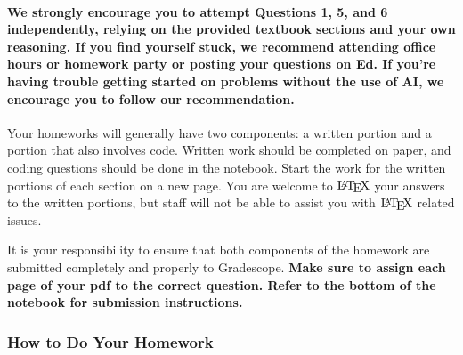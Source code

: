 \documentclass[11pt]{article}
\let\Oldlatex\LaTeX
\renewcommand{\LaTeX}{\textrm{\Oldlatex}}
\begin{document}
\hypertarget{we-strongly-encourage-you-to-attempt-questions-1-5-and-6-independently-relying-on-the-provided-textbook-sections-and-your-own-reasoning.-if-you-find-yourself-stuck-we-recommend-attending-office-hours-or-homework-party-or-posting-your-questions-on-ed.-if-youre-having-trouble-getting-started-on-problems-without-the-use-of-ai-we-encourage-you-to-follow-our-recommendation.}{%
\paragraph{\texorpdfstring{\textbf{We strongly encourage you to attempt
Questions 1, 5, and 6 independently, relying on the provided textbook
sections and your own reasoning. If you find yourself stuck, we
recommend attending office hours or homework party or posting your
questions on Ed. If you're having trouble getting started on problems
without the use of AI, we encourage you to follow our
recommendation.}}{We strongly encourage you to attempt Questions 1, 5, and 6 independently, relying on the provided textbook sections and your own reasoning. If you find yourself stuck, we recommend attending office hours or homework party or posting your questions on Ed. If you're having trouble getting started on problems without the use of AI, we encourage you to follow our recommendation.}}\label{we-strongly-encourage-you-to-attempt-questions-1-5-and-6-independently-relying-on-the-provided-textbook-sections-and-your-own-reasoning.-if-you-find-yourself-stuck-we-recommend-attending-office-hours-or-homework-party-or-posting-your-questions-on-ed.-if-youre-having-trouble-getting-started-on-problems-without-the-use-of-ai-we-encourage-you-to-follow-our-recommendation.}}

Your homeworks will generally have two components: a written portion and
a portion that also involves code. Written work should be completed on
paper, and coding questions should be done in the notebook. Start the
work for the written portions of each section on a new page. You are
welcome to \(\LaTeX\) your answers to the written portions, but staff
will not be able to assist you with \(\LaTeX\) related issues.

It is your responsibility to ensure that both components of the homework
are submitted completely and properly to Gradescope. \textbf{Make sure
to assign each page of your pdf to the correct question. Refer to the
bottom of the notebook for submission instructions.}

    \hypertarget{how-to-do-your-homework}{%
\subsubsection{How to Do Your Homework}\label{how-to-do-your-homework}}
\end{document}
